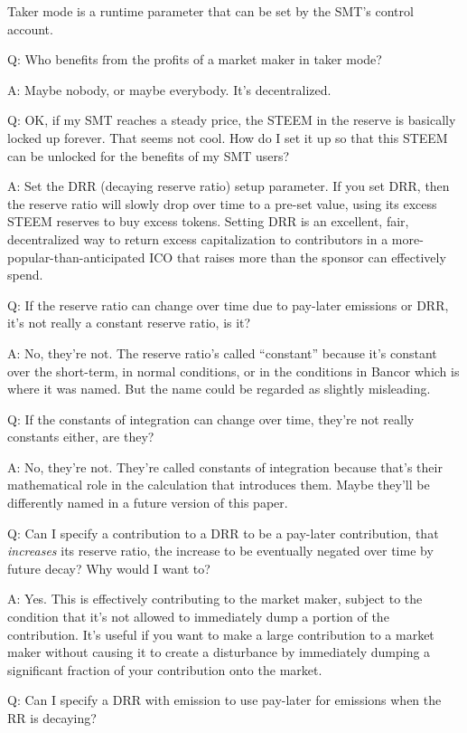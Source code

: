 \documentclass{article}
\begin{document}
Taker mode is a runtime parameter that can be set by the SMT's control account.

Q:  Who benefits from the profits of a market maker in taker mode?

A:  Maybe nobody, or maybe everybody.  It's decentralized.

Q:  OK, if my SMT reaches a steady price, the STEEM in the reserve is basically
locked up forever.  That seems not cool.  How do I set it up so that this STEEM
can be unlocked for the benefits of my SMT users?

A:  Set the DRR (decaying reserve ratio) setup parameter.  If you set DRR, then the
reserve ratio will slowly drop over time to a pre-set value, using its excess STEEM
reserves to buy excess tokens.  Setting DRR is an excellent, fair, decentralized
way to return excess capitalization to contributors in a more-popular-than-anticipated
ICO that raises more than the sponsor can effectively spend.

Q:  If the reserve ratio can change over time due to pay-later emissions or DRR,
it's not really a constant reserve ratio, is it?

A:  No, they're not.  The reserve ratio's called ``constant'' because it's constant
over the short-term, in normal conditions, or in the conditions in Bancor which is
where it was named.  But the name could be regarded as slightly misleading.

Q:  If the constants of integration can change over time, they're not really
constants either, are they?

A:  No, they're not.  They're called constants of integration because that's their
mathematical role in the calculation that introduces them.  Maybe they'll be
differently named in a future version of this paper.

Q:  Can I specify a contribution to a DRR to be a pay-later contribution, that
\textit{increases} its reserve ratio, the increase to be eventually negated over
time by future decay?  Why would I want to?

A:  Yes.  This is effectively contributing to the market maker,
subject to the condition that it's not allowed to immediately dump a portion
of the contribution.  It's useful if you want to make a large contribution
to a market maker without causing it to create a disturbance by immediately
dumping a significant fraction of your contribution onto the market.

Q:  Can I specify a DRR with emission to use pay-later for emissions when the
RR is decaying?
\end{document}
